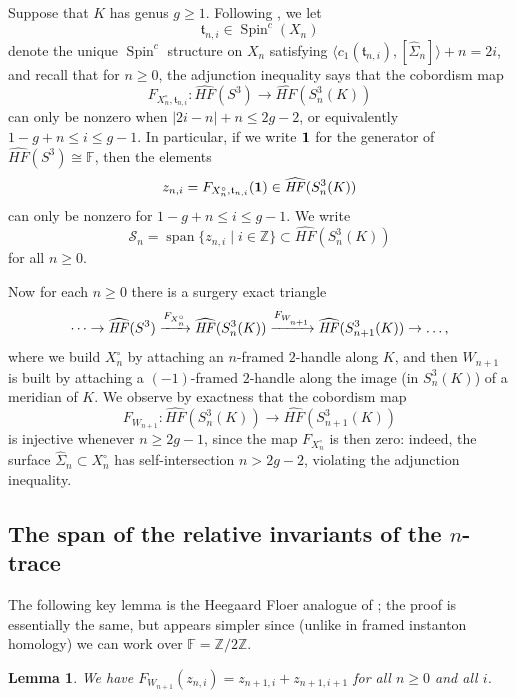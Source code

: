 \documentclass[11pt]{amsart}
\newtheorem {lemma}[theorem]{Lemma}
\numberwithin{equation}{section}
\numberwithin{theorem}{section}
\theoremstyle{definition}
\newcommand{\Z}{\mathbb{Z}}
\newcommand{\F}{\mathbb{F}}
\newcommand{\spc}{\operatorname{Spin}^c}
\newcommand{\spint}{\mathfrak{t}}
\newcommand{\cS}{\mathcal{S}}
\DeclareMathOperator{\Span}{span}
\newcommand{\hfhat}{\widehat{\mathit{HF}}}
\begin{document}
Suppose that $K$ has genus $g \geq 1$.  Following \cite{bs-fibered-sqp}, we let
\[ \spint_{n,i} \in \spc(X_n) \]
denote the unique $\spc$ structure on $X_n$ satisfying $\langle c_1(\spint_{n,i}), [\hat\Sigma_n] \rangle + n = 2i$, and recall that for $n \geq 0$, the adjunction inequality says that the cobordism map
\[ F_{X^\circ_n,\spint_{n,i}}: \hfhat(S^3) \to \hfhat(S^3_n(K)) \]
can only be nonzero when $|2i-n| + n \leq 2g-2$, or equivalently $1-g+n \leq i \leq g-1$.  In particular, if we write ${\bf 1}$ for the generator of $\hfhat(S^3) \cong \F$, then the elements
\begin{equation} \label{eq:zni}
z_{n,i} = F_{X^\circ_n,\spint_{n,i}}({\bf 1}) \in \hfhat(S^3_n(K))
\end{equation}
can only be nonzero for $1-g+n \leq i \leq g-1$.  We write
\begin{equation} \label{eq:span-z}
\cS_n = \Span\{ z_{n,i} \mid i \in \Z \} \subset \hfhat(S^3_n(K))
\end{equation}
for all $n \geq 0$.

Now for each $n \geq 0$ there is a surgery exact triangle
\begin{equation} \label{eq:surgery-triangle}
\dots \to \hfhat(S^3) \xrightarrow{F_{X^\circ_{n\vphantom{1}}}} \hfhat(S^3_n(K)) \xrightarrow{F_{W^{\vphantom{\circ}}_{n+1}}} \hfhat(S^3_{n+1}(K)) \to \dots,
\end{equation}
where we build $X^\circ_n$ by attaching an $n$-framed $2$-handle along $K$, and then $W_{n+1}$ is built by attaching a $(-1)$-framed $2$-handle along the image (in $S^3_n(K)$) of a meridian of $K$.  We observe by exactness that the cobordism map
\[ F_{W_{n+1}}: \hfhat(S^3_n(K)) \to \hfhat(S^3_{n+1}(K)) \]
is injective whenever $n \geq 2g-1$, since the map $F_{X^\circ_n}$ is then zero: indeed, the surface $\hat\Sigma_n \subset X^\circ_n$ has self-intersection $n > 2g-2$, violating the adjunction inequality.

%
%
%

\subsection{The span of the relative invariants of the $n$-trace}

The following key lemma is the Heegaard Floer analogue of \cite[Proposition~7.1]{bs-lspace}; the proof is essentially the same, but appears simpler since (unlike in framed instanton homology) we can work over $\F=\Z/2\Z$.

\begin{lemma} \label{lem:fw-z}
We have $F_{W_{n+1}}(z_{n,i}) = z_{n+1,i} + z_{n+1,i+1}$ for all $n \geq 0$ and all $i$.
\end{lemma}
\end{document}
